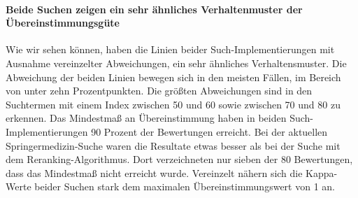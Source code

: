 \paragraph{Beide Suchen zeigen ein sehr ähnliches Verhaltenmuster der Übereinstimmungsgüte} Wie wir sehen können, haben die Linien beider Such-Implementierungen mit Ausnahme vereinzelter Abweichungen, ein sehr ähnliches Verhaltensmuster. Die Abweichung der beiden Linien bewegen sich in den meisten Fällen, im Bereich von unter zehn Prozentpunkten. Die größten Abweichungen sind in den Suchtermen mit einem Index zwischen 50 und 60 sowie zwischen 70 und 80 zu erkennen. Das Mindestmaß an Übereinstimmung haben in beiden Such-Implementierungen 90 Prozent der Bewertungen erreicht. Bei der aktuellen Springermedizin-Suche waren die Resultate etwas besser als bei der Suche mit dem Reranking-Algorithmus. Dort verzeichneten nur sieben der 80 Bewertungen, dass das Mindestmaß nicht erreicht wurde. Vereinzelt nähern sich die Kappa-Werte beider Suchen stark dem maximalen Übereinstimmungswert von 1 an. 
